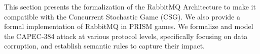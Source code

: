 


This section presents the formalization of the RabbitMQ Architecture to make it compatible with the Concurrent Stochastic Game (CSG). We also provide a formal implementation of RabbitMQ in PRISM games. We formalize and model the CAPEC-384 \cite{capec384} attack at various protocol levels, specifically focusing on data corruption, and establish semantic rules to capture their impact.



